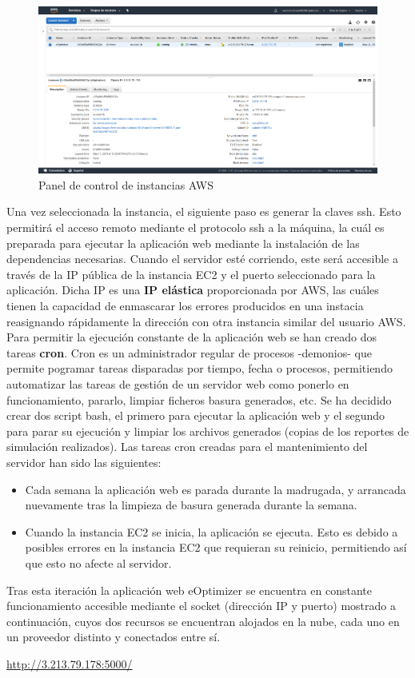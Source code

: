 \begin{figure}[H]
            \centering
            \includegraphics[width=17cm]{figs/aws_control_panel.png}
            \caption{Panel de control de instancias AWS}
            \label{fig:AWSControlPanel}
\end{figure}

Una vez seleccionada la instancia, el siguiente paso es generar la claves ssh. Esto permitirá el acceso remoto mediante el protocolo ssh a la máquina, la cuál es preparada para ejecutar la aplicación web mediante la instalación de las dependencias necesarias. Cuando el servidor esté corriendo, este será accesible a través de la IP pública de la instancia \gls{EC2} y el puerto seleccionado para la aplicación. Dicha IP es una \textbf{IP elástica} proporcionada por \gls{AWS}, las cuáles tienen la capacidad de enmascarar los errores producidos en una instacia reasignando rápidamente la dirección con otra instancia similar del usuario \gls{AWS}. Para permitir la ejecución constante de la aplicación web se han creado dos tareas \textbf{cron}. Cron es un administrador regular de procesos -demonios- que permite pogramar tareas disparadas por tiempo, fecha o procesos, permitiendo automatizar las tareas de gestión de un servidor web como ponerlo en funcionamiento, pararlo, limpiar ficheros basura generados, etc. Se ha decidido crear dos script bash, el primero para ejecutar la aplicación web y el segundo para parar su ejecución y limpiar los archivos generados (copias de los reportes de simulación realizados). Las tareas cron creadas para el mantenimiento del servidor han sido las siguientes:
\begin{itemize}
\item Cada semana la aplicación web es parada durante la madrugada, y arrancada nuevamente tras la limpieza de basura generada durante la semana.
\item Cuando la instancia \gls{EC2} se inicia, la aplicación se ejecuta. Esto es debido a posibles errores en la instancia \gls{EC2} que requieran su reinicio, permitiendo así que esto no afecte al servidor.
\end{itemize}

Tras esta iteración la aplicación web eOptimizer se encuentra en constante funcionamiento accesible mediante el socket (dirección IP y puerto) mostrado a continuación, cuyos dos recursos se encuentran alojados en la nube, cada uno en un proveedor distinto y conectados entre sí.\\

\centerline{\url{http://3.213.79.178:5000/}}
